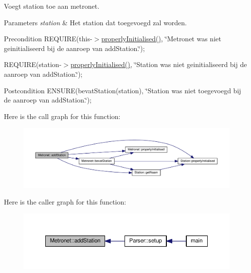 Voegt station toe aan metronet. 


\begin{DoxyParams}{Parameters}
{\em station} & Het station dat toegevoegd zal worden. \\
\hline
\end{DoxyParams}
\begin{DoxyPrecond}{Precondition}
R\+E\+Q\+U\+I\+RE(this-\/$>$\hyperlink{class_metronet_a3d2adce29a947f162924279b766de645}{properly\+Initialised()}, \char`\"{}\+Metronet was niet geinitialiseerd bij de aanroep van add\+Station.\char`\"{}); 

R\+E\+Q\+U\+I\+RE(station-\/$>$\hyperlink{class_metronet_a3d2adce29a947f162924279b766de645}{properly\+Initialised()}, \char`\"{}\+Station was niet geinitialiseerd bij de aanroep van add\+Station.\char`\"{}); 
\end{DoxyPrecond}
\begin{DoxyPostcond}{Postcondition}
E\+N\+S\+U\+RE(bevat\+Station(station), \char`\"{}\+Station was niet toegevoegd bij de aanroep van add\+Station.\char`\"{}); 
\end{DoxyPostcond}


Here is the call graph for this function\+:
\nopagebreak
\begin{figure}[H]
\begin{center}
\leavevmode
\includegraphics[width=350pt]{class_metronet_ab2cbe114faa2ee312f6ea4e551962193_cgraph}
\end{center}
\end{figure}




Here is the caller graph for this function\+:
\nopagebreak
\begin{figure}[H]
\begin{center}
\leavevmode
\includegraphics[width=350pt]{class_metronet_ab2cbe114faa2ee312f6ea4e551962193_icgraph}
\end{center}
\end{figure}



